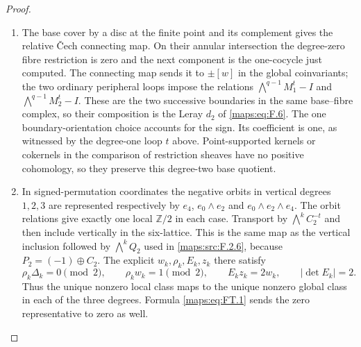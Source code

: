 \begin{proof}
\begin{enumerate}[label=\arabic*.]
\item The base cover by a disc at the finite point and its
complement gives the relative \v{C}ech connecting map.  On their
annular intersection the degree-zero fibre restriction is zero and
the next component is the one-cocycle just computed.
The connecting map sends it to $\pm[w]$ in the global coinvariants;
the two ordinary peripheral loops impose the relations
$\bigwedge^{q-1}M_1^t-I$ and $\bigwedge^{q-1}M_2^t-I$.
These are the two successive boundaries in the same base--fibre
complex, so their composition is the Leray $d_2$ of
\eqref{maps:eq:F.6}.  The one boundary-orientation choice accounts
for the sign.  Its coefficient is one, as witnessed by the
degree-one loop $t$ above.  Point-supported kernels or cokernels in
the comparison of restriction sheaves have no positive cohomology,
so they preserve this degree-two base quotient.

\item In signed-permutation coordinates the negative orbits in
vertical degrees $1,2,3$ are represented respectively by
$e_4$, $e_0\wedge e_2$ and $e_0\wedge e_2\wedge e_4$.
The orbit relations give exactly one local $\mathbb Z/2$ in each
case.  Transport by $\bigwedge^kC_2^{-t}$ and then include vertically
in the six-lattice.  This is the same map as the vertical inclusion
followed by $\bigwedge^kQ_2$ used in
\cref{maps:src:F.2.6}, because $P_2=(-1)\oplus C_2$.
The explicit $w_k,\rho_k,E_k,z_k$ there satisfy
\[
 \rho_k\Delta_k=0\pmod2,\qquad
 \rho_kw_k=1\pmod2,\qquad E_kz_k=2w_k,
 \qquad |\det E_k|=2.
\]
Thus the unique nonzero local class maps to the unique nonzero
global class in each of the three degrees.  Formula
\eqref{maps:eq:FT.1} sends the zero representative to zero as well.
\end{enumerate}
\end{proof}




